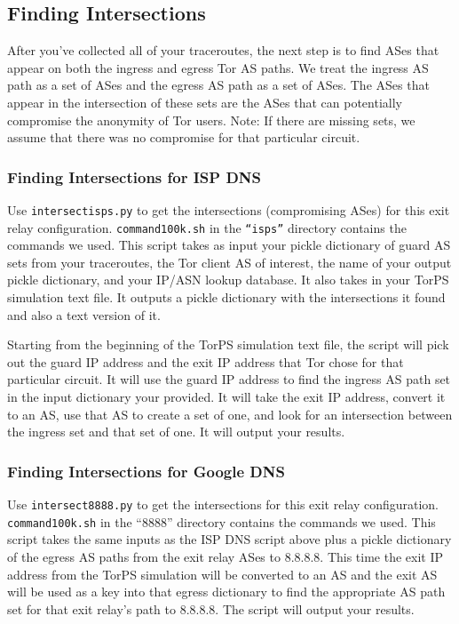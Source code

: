 \documentclass{article}
\begin{document}
\subsection{Finding Intersections}
After you've collected all of your traceroutes, the next step is to find ASes that 
appear on both the ingress and egress Tor AS paths. We treat the ingress AS path 
as a set of ASes and the egress AS path as a set of ASes. The ASes that appear 
in the intersection of these sets are the ASes that can potentially compromise 
the anonymity of Tor users. Note: If there are missing sets, we assume that 
there was no compromise for that particular circuit.

\subsubsection{Finding Intersections for ISP DNS}
Use {\tt intersect\textunderscore isps.py} to get the intersections (compromising ASes) for 
this exit relay configuration. {\tt command\textunderscore 100k.sh} in the {\tt ``isps''} 
directory contains the commands we used. This script takes as input your pickle dictionary of 
guard AS sets from your traceroutes, the Tor client AS of interest, the name of your 
output pickle 
dictionary, and your IP/ASN lookup database. It also takes in your TorPS simulation 
text file. It outputs a pickle dictionary with the intersections it found and also 
a text version of it. 

Starting from the beginning of the TorPS simulation text file, 
the script will pick out the guard IP address and the exit IP address that 
Tor chose for that particular circuit. It will use the guard IP address to find 
the ingress AS path set in the input dictionary your provided. It will take the 
exit IP address, convert it to an AS, use that AS to create a set of one, and 
look for an intersection between the ingress set and that set of one. It will 
output your results.

\subsubsection{Finding Intersections for Google DNS}
Use {\tt intersect\textunderscore 8888.py} to get the intersections for 
this exit relay configuration. {\tt command\textunderscore 100k.sh} in the ``8888'' 
directory contains the commands we used. This script takes the same inputs as the ISP 
DNS script above 
plus a pickle dictionary of the egress AS paths from the exit relay ASes to 8.8.8.8. 
This time the exit IP address from the TorPS simulation will be converted to an 
AS and the exit AS will be used as a key 
into that egress dictionary to find the appropriate AS path set for that exit relay's 
path to 8.8.8.8. The script will output your results.
\end{document}
